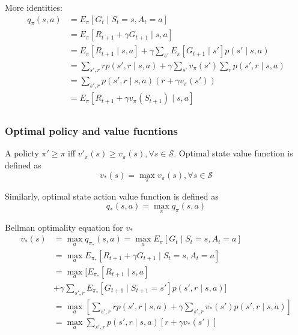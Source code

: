 \documentclass[twocolumn, 10pt]{article}
\newcommand{\stateset}{\mathcal{S}}
\begin{document}
	More identities:
	$$
	\begin{aligned}
	q_{\pi}(s, a) &= E_{\pi} [G_t \mid S_t = s, A_t = a]  \\
	&= E_{\pi} [R_{t+1} + \gamma G_{t+1} \mid  s,  a] \\
	&=   E_{\pi} [R_{t+1} \mid s, a] + \gamma \sum_{s'} E_{\pi}  [G_{t+1} \mid s'] p(s' \mid s, a) \\
	&=  \sum_{s', r}  r p(s', r  \mid s, a) + \gamma \sum_{s' } v_{\pi}(s')   \sum_{r} p(s', r \mid s, a) \\
	&=  \sum_{s', r} p(s', r  \mid s, a)  ( r  + \gamma  v_{\pi}(s') ) \\
	&=   E_{\pi} [R_{t+1}  + \gamma  v_{\pi}(S_{t+1}) \mid s, a] \\
	\end{aligned}
	$$
	
	\subsubsection*{Optimal policy and value fucntions}
	
	A policty $\pi' \geq \pi$ iff  $v'_{\pi}(s) \geq v_{\pi}(s), \forall s \in \stateset$. Optimal state value function is defined as $$v_*(s) = \max_{\pi} v_{\pi}(s),  \forall s \in \stateset$$
	
	Similarly,  optimal state action value function is defined as $$ q_*(s, a) = \max_{\pi} q_{\pi}(s, a) $$
	
	Bellman optimality equation for $v_*$  
	$$
	\begin{aligned}
	v_*(s) & = \max_{a} q_{\pi_*}(s, a) =\max_a E_{\pi} [G_t \mid S_t = s, A_t = a] \\
	& = \max_{a} E_{\pi_*} [R_{t+ 1} + \gamma G_{t+1} \mid S_t = s, A_t = a] \\
	& = \max_{a} [  E_{\pi_*} [R_{t+ 1}  \mid s, a ]  \\
	& + \gamma   \sum_{s', r}  E_{\pi_*} [G_{t+1}  \mid S_{t+1} = s']p(s', r \mid  s, a)]  \\
	& = \max_{a} \left[  \sum_{s', r} r p(s', r \mid s, a)   + \gamma   \sum_{s', r}  v_*(s')p(s', r \mid  s, a) \right]  \\
	& = \max_{a} \sum_{s', r} p(s', r \mid s, a) [r + \gamma v_*(s')] \\
	\end{aligned}
	$$
	
\end{document}
